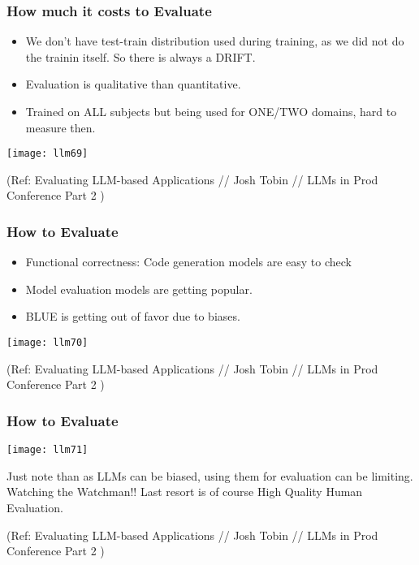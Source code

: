 \begin{frame}[fragile]\frametitle{How much it costs to Evaluate}

\begin{itemize}
\item We don't have test-train distribution used during training, as we did not do the trainin itself. So there is always a DRIFT.
\item Evaluation is qualitative than quantitative.
\item Trained on ALL subjects but being used for ONE/TWO domains, hard to measure then.
\end{itemize}

\begin{center}
\texttt{[image: llm69]}
\end{center}		


{\tiny (Ref: Evaluating LLM-based Applications // Josh Tobin // LLMs in Prod Conference Part 2 )}

\end{frame}

\begin{frame}[fragile]\frametitle{How to Evaluate}

\begin{itemize}
\item Functional correctness: Code generation models are easy to check
\item Model evaluation models are getting popular.
\item BLUE is getting out of favor due to biases.
\end{itemize}

\begin{center}
\texttt{[image: llm70]}
\end{center}		


{\tiny (Ref: Evaluating LLM-based Applications // Josh Tobin // LLMs in Prod Conference Part 2 )}

\end{frame}

\begin{frame}[fragile]\frametitle{How to Evaluate}


\begin{center}
\texttt{[image: llm71]}
\end{center}		

Just note than as LLMs can be biased, using them for evaluation can be limiting. Watching the Watchman!!
Last resort is of course High Quality Human Evaluation.

{\tiny (Ref: Evaluating LLM-based Applications // Josh Tobin // LLMs in Prod Conference Part 2 )}

\end{frame}

